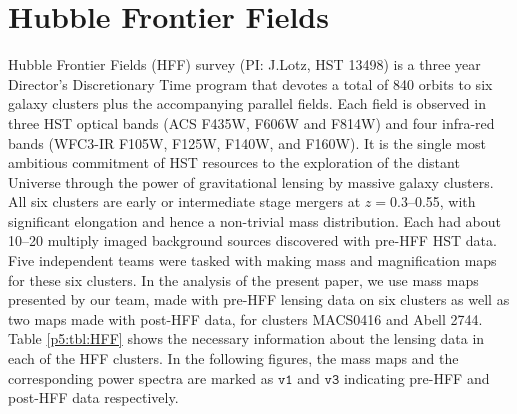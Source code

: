 \documentclass[
  11pt,
  twoside,
  openright,
  titlepage,
  headings=optiontoheadandtoc
]{scrbook}
\begin{document}

\section{Hubble Frontier Fields}\label{p5:sec:hff}

Hubble Frontier Fields (HFF) survey (PI: J.Lotz, HST 13498) is a three year
Director's Discretionary Time program that devotes a total of 840 orbits to six
galaxy clusters plus the accompanying parallel fields.  Each field is observed in
three HST optical bands (ACS F435W, F606W and F814W) and four infra-red bands (WFC3-IR
F105W, F125W, F140W, and F160W).
It is the single most ambitious commitment of HST resources to the exploration of
the distant Universe through the power of gravitational lensing by massive galaxy
clusters. All six clusters are early or intermediate stage mergers at $z=0.3$--0.55,
with significant elongation and hence a non-trivial mass distribution. Each had about
10--20 multiply imaged background sources discovered with pre-HFF HST
data. Five independent teams were tasked with making mass and magnification maps for
these six clusters. In the analysis of the present paper, we use mass maps presented
by our team, made with pre-HFF lensing data on six clusters as well as two maps made
with post-HFF data, for clusters MACS0416 and Abell 2744. Table \ref{p5:tbl:HFF} shows the necessary
information about the lensing data in each of the HFF clusters.
In the following figures, the mass maps and the corresponding power spectra are
marked as $\mathtt{v1}$ and $\mathtt{v3}$ indicating pre-HFF and post-HFF data respectively.

\begin{table}
\centering
{}
\caption{Lensing data from different HFF clusters.}
\label{p5:tbl:HFF}
\end{table}
\end{document}
